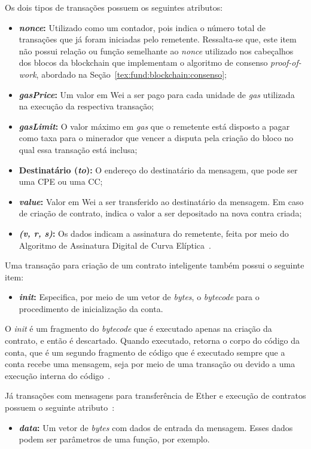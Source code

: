 Os dois tipos de transações possuem os seguintes atributos:
\begin{itemize}
    \item \textbf{\textit{nonce}:} Utilizado como um contador, pois indica o número total de transações que já foram iniciadas pelo remetente. Ressalta-se que, este item não possui relação ou função semelhante ao \textit{nonce} utilizado nos cabeçalhos dos blocos da blockchain que implementam o algoritmo de consenso \textit{proof-of-work}, abordado na Seção~\ref{tex:fund:blockchain:consenso};
    \item \textbf{\textit{gasPrice}:} Um valor em Wei a ser pago para cada unidade de \textit{gas} utilizada na execução da respectiva transação;
    \item \textbf{\textit{gasLimit}:} O valor máximo em \textit{gas} que o remetente está disposto a pagar como taxa para o minerador que vencer a disputa pela criação do bloco no qual essa transação está inclusa;
    \item \textbf{Destinatário (\textit{to}):} O endereço do destinatário da mensagem, que pode ser uma CPE ou uma CC;
    \item \textbf{\textit{value}:} Valor em Wei a ser transferido ao destinatário da mensagem. Em caso de criação de contrato, indica o valor a ser depositado na nova contra criada;
    \item \textbf{\textit{(v, r, s)}:} Os dados indicam a assinatura do remetente, feita por meio do Algoritmo de Assinatura Digital de Curva Elíptica~\cite{johnson2001elliptic-ethereum}.
\end{itemize}

Uma transação para criação de um contrato inteligente também possui o seguinte item:
\begin{itemize}
    \item \textbf{\textit{init}:} Especifica, por meio de um vetor de \textit{bytes}, o \textit{bytecode} para o procedimento de inicialização da conta. 
\end{itemize}

O \textit{init} é um fragmento do \textit{bytecode} que é executado apenas na criação da contrato, e então é descartado. Quando executado, retorna o corpo do código da conta, que é um segundo fragmento de código que é executado sempre que a conta recebe uma mensagem, seja por meio de uma transação ou devido a uma execução interna do código~\cite{wood2014ethereum-yellow-paper}. 

Já transações com mensagens para transferência de Ether e execução de contratos possuem o seguinte atributo~\cite{wood2014ethereum-yellow-paper}:
\begin{itemize}
    \item \textbf{\textit{data}:} Um vetor de \textit{bytes} com dados de entrada da mensagem. Esses dados podem ser parâmetros de uma função, por exemplo.
\end{itemize}
